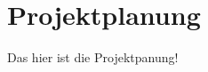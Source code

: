 \documentclass[main.tex]{subfiles}
\begin{document}
\section{Projektplanung}

Das hier ist die Projektpanung!
\end{document}
